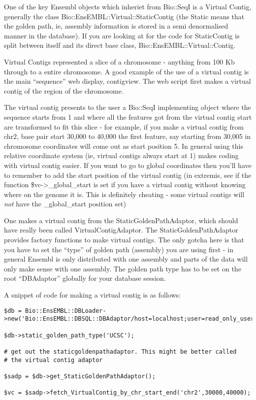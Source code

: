 \documentclass[11pt,a4paper]{article}
\begin{document}
One of the key Ensembl objects which inheriet from Bio::SeqI is a
Virtual Contig, generally the class
Bio::EnsEMBL::Virtual::StaticContig (the Static means that the golden
path, ie, assembly information is stored in a semi denormalised manner
in the database). If you are looking at for the code for StaticContig
is split between itself and its direct base class,
Bio::EnsEMBL::Virtual::Contig.

Virtual Contigs represented a slice of a chromosome - anything from 
100 Kb through to a entire chromosome. A good example of the use of
a virtual contig is the main ``sequence'' web display, contigview. The web 
script first makes a virtual contig of the region of the chromosome.


The virtual contig presents to the user a Bio::SeqI implementing
object where the sequence starts from 1 and where all the features got
from the virtual contig start are transformed to fit this slice - for
example, if you make a virtual contig from chr2, base pair start
30,000 to 40,000 the first feature, say starting from 30,005 in
chromosome coordinates will come out as start position 5. In general
using this relative coordinate system (ie, virtual contigs always
start at 1) makes coding with virtual contig easier. If you want to go
to global coordinates then you'll have to remember to add the start
position of the virtual contig (in extremis, see if the function
\$vc->\_global\_start is set if you have a virtual contig without
knowing where on the genome it is. This is definitely cheating - some
virtual contigs will \emph{not} have the \_global\_start position set)


One makes a virtual contig from the StaticGoldenPathAdaptor, which should
have really been called VirtualContigAdaptor. The StaticGoldenPathAdaptor 
provides factory functions to make virtual contigs. The only gotcha here is
that you have to set the ``type'' of golden path (assembly) you are using
first - in general Ensembl is only distributed with one assembly and parts
of the data will only make sense with one assembly. The golden path type
has to be set on the root ``DBAdaptor'' globally for your database session.

A snippet of code for making a virtual contig is as follows:

\begin{verbatim}
$db = Bio::EnsEMBL::DBLoader->new('Bio::EnsEMBL::DBSQL::DBAdaptor/host=localhost;user=read_only_user;dbname=test_ensembl');

$db->static_golden_path_type('UCSC');

# get out the staticgoldenpathadaptor. This might be better called
# the virtual contig adaptor

$sadp = $db->get_StaticGoldenPathAdaptor();

$vc = $sadp->fetch_VirtualContig_by_chr_start_end('chr2',30000,40000);
\end{verbatim}
\end{document}
